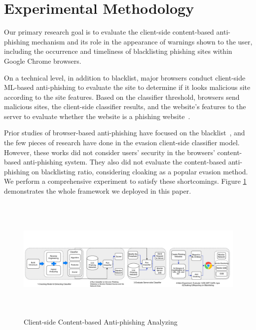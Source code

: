 
\section{Experimental Methodology}
\label{s:methodology}

Our primary research goal is to evaluate the client-side content-based anti-phishing mechanism and its role in the appearance of warnings shown to the user, including the occurrence and timeliness of blacklisting phishing sites within Google Chrome browsers.

On a technical level, in addition to blacklist, major browsers conduct client-side ML-based anti-phishing to evaluate the site to determine if it looks malicious site according to the site features. Based on the classifier threshold, browsers send malicious sites, the client-side classifier results, and the website's features to the server to evaluate whether the website is a phishing website~\cite{google-online-security-blog-2019}.

Prior studies of browser-based anti-phishing have focused on the blacklist~\cite{oest2019phishfarm,han2016phisheye,sheng2009empirical}, and the few pieces of research have done in the evasion client-side classifier model. However, these works did not consider users' security in the browsers' content-based anti-phishing system. They also did not evaluate the content-based anti-phishing on blacklisting ratio, considering cloaking as a popular evasion method. We perform a comprehensive experiment to satisfy these shortcomings. Figure \ref{ frame work} demonstrates the whole framework we deployed in this paper.

\begin{figure}[h]
  \includegraphics[width=\textwidth,height=6cm]{Untitled Diagram (3).pdf}
  \caption{ Client-side Content-based Anti-phishing Analyzing}
  \label{ frame work}
\end{figure}

